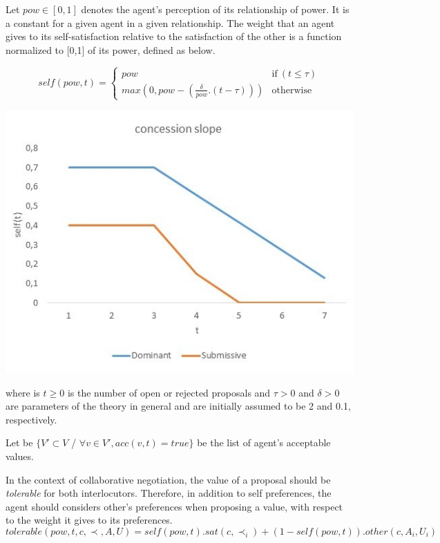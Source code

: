 \documentclass{llncs}
\begin{document}
		Let  $pow \in [0, 1] $ denotes the agent's perception of its relationship of power. It is a constant for a given agent in a given relationship.
	The weight that an agent gives to its self-satisfaction relative to	the satisfaction of the other is a function normalized to 	[0,1] of its power, defined as below.
	\noindent
	\begin{minipage}{0.5\textwidth}
		\begin{equation}
		self(pow, t) = \left\{\begin{array}{ll}
		pow & \mathrm{if\ } (t \leq \tau)\\
		max(0, pow - (\frac{\delta}{pow} . (t - \tau))) & \mathrm{otherwise}
		\end{array}\right.
		\end{equation}
	\end{minipage}
	 \begin{minipage} {0.5\textwidth}
		\includegraphics[width=\linewidth,keepaspectratio=true]{graphs/slope.jpg}
	 \end{minipage}
	
	where is $t \geq 0$ is the number of open or rejected proposals and $\tau > 0$ and $\delta > 0$
	are parameters of the theory in general and are initially assumed to
	be 2 and 0.1, respectively.
	
	Let be	$\{V' \subset V$ / $\forall v \in V', acc(v,t) = true\}$ be the list of agent's acceptable values. 
	
		In the context of collaborative negotiation, the value of a proposal should be \textit{tolerable} for both interlocutors. Therefore, in addition to self preferences, the agent should considers other's preferences when proposing a value, with respect to the weight it gives to its preferences.
	\begin{equation}
	 tolerable(pow, t, c, \prec, A, U) = self(pow, t) . sat(c, \prec_i)  +  (1 - self(pow, t)) . other(c, A_i, U_i)
	\end{equation}
	
\end{document}

